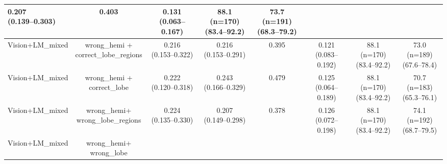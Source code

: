 \documentclass[FCD_GNN.tex]{subfiles}
\begin{document}
\begin{table}[H]
\begin{tabular}{lccccccc}
\makecell{\colorbox{orange!15}{0.207} \\ (0.139--0.303)} &
0.403 &
\makecell{0.131 \\ (0.063--0.167)} &
\makecell{88.1 (n=170) \\ (83.4--92.2)} &
\makecell{\colorbox{cyan!15}{73.7 (n=191)} \\ (68.3--79.2)} \\
\hline
Vision+LM\_mixed & 
\makecell{wrong\_hemi + \\ correct\_lobe\_regions} &
\makecell{0.216 \\ (0.153--0.322)} &
\makecell{\colorbox{cyan!15}{0.216} \\ (0.153--0.291)} &
0.395 &
\makecell{0.121 \\ (0.083--0.192)} &
\makecell{88.1 (n=170) \\ (83.4--92.2)} &
\makecell{\colorbox{orange!15}{73.0 (n=189)} \\ (67.6--78.4)} \\
\hline
Vision+LM\_mixed & 
\makecell{wrong\_hemi + \\ correct\_lobe} &
\makecell{0.222 \\ (0.120--0.318)} &
\makecell{\colorbox{green!15}{0.243} \\ (0.166--0.329)} &
\colorbox{cyan!15}{0.479} &
\makecell{0.125 \\ (0.064--0.189)} &
\makecell{88.1 (n=170) \\ (83.4--92.2)} &
\makecell{70.7 (n=183) \\ (65.3--76.1)} \\
\hline
Vision+LM\_mixed &
\makecell{wrong\_hemi+\\wrong\_lobe\_regions} &
\makecell{0.224 \\ (0.135--0.330)} &
\makecell{\colorbox{orange!15}{0.207} \\ (0.149--0.298)} &
0.378 &
\makecell{0.126 \\ (0.072--0.198)} &
\makecell{88.1 (n=170) \\ (83.4--92.2)} &
\makecell{\colorbox{green!15}{74.1 (n=192)} \\ (68.7--79.5)} \\
\hline
Vision+LM\_mixed &
\makecell{wrong\_hemi+\\wrong\_lobe} &

\end{tabular}
\end{table}
\end{document}
